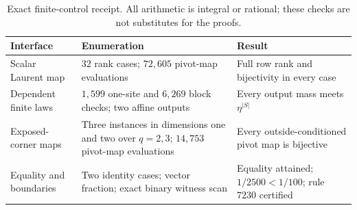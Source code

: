 \begin{table}[t]
  \centering
  \small
  \setlength{\tabcolsep}{4pt}
  \renewcommand{\arraystretch}{1.11}
  \caption{Exact finite-control receipt.  All arithmetic is integral or
  rational; these checks are not substitutes for the proofs.}
  \label{tab:control-receipt}
  \begin{tabularx}{\textwidth}{@{}
    >{\RaggedRight\arraybackslash}p{34mm}
    >{\RaggedRight\arraybackslash}X
    >{\RaggedRight\arraybackslash}p{35mm}@{}}
    \toprule
    Interface & Enumeration & Result \\
    \midrule
    Scalar Laurent map
      & $32$ rank cases; $72{,}605$ pivot-map evaluations
      & Full row rank and bijectivity in every case \\
    Dependent finite laws
      & $1{,}599$ one-site and $6{,}269$ block checks; two affine outputs
      & Every output mass meets $\eta^{|S|}$ \\
    Exposed-corner maps
      & Three instances in dimensions one and two over $q=2,3$;
        $14{,}753$ pivot-map evaluations
      & Every outside-conditioned pivot map is bijective \\
    Equality and boundaries
      & Two identity cases; vector fraction; exact binary witness scan
      & Equality attained; $1/2500<1/100$; rule $7230$ certified \\
    \bottomrule
  \end{tabularx}
\end{table}
